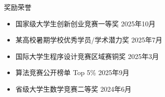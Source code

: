 \documentclass{resume_blue}
\begin{document}
\begin{rSection}{奖励荣誉}
\begin{itemize}
  \item 国家级大学生创新创业竞赛一等奖 \hfill 2025年10月
  \item 某高校暑期学校优秀学员/学术潜力奖 \hfill 2025年7月
  \item 国际大学生程序设计竞赛区域赛铜奖 \hfill 2025年3月
  \item 算法竞赛公开榜单 Top 5\% \hfill 2025年9月
  \item 省级大学生数学竞赛二等奖 \hfill 2024年6月
\end{itemize}
\end{rSection}
\end{document}
